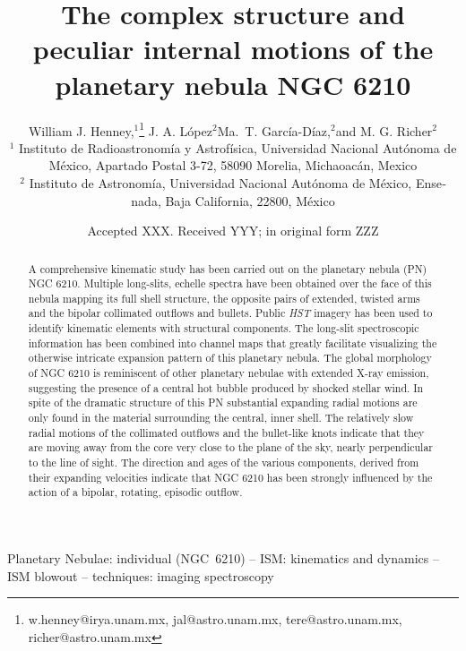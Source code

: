 \documentclass[useAMS, usenatbib]{mnras}
\title{The complex structure and peculiar internal motions of the planetary nebula NGC 6210}
\author[Henney et al.]{
  William J. Henney,\(^1\)\thanks{
    w.henney@irya.unam.mx,
    jal@astro.unam.mx,
    tere@astro.unam.mx,
    richer@astro.unam.mx
  }
  J. A. López\(^2\)\footnotemark[1]
  Ma.\ T. García-Díaz,\(^2\)\footnotemark[1]
  and M. G. Richer\(^2\)\footnotemark[1]
  \\
  \(^1\)\foreignlanguage{spanish}{
    Instituto de Radioastronomía y
    Astrofísica, Universidad Nacional Autónoma de México, Apartado
    Postal 3-72, 58090 Morelia, Michaoacán, Mexico}
  \\
  \(^2\)\foreignlanguage{spanish}{
    Instituto de Astronomía,
    Universidad Nacional Autónoma de México,
    Ensenada, Baja California, 22800, México}
}
\date{Accepted XXX. Received YYY; in original form ZZZ}
\begin{document}
 
\label{firstpage}
\pagerange{\pageref{firstpage}--\pageref{lastpage}}
\maketitle

\begin{abstract}
  A comprehensive kinematic study has been carried out on the planetary nebula (PN) NGC 6210. Multiple long-slits, echelle spectra have been obtained over the face of this nebula mapping its full shell structure, the opposite pairs of extended, twisted arms and the bipolar collimated outflows and bullets. Public {\it HST} imagery has been used to identify kinematic elements with structural components. The long-slit spectroscopic information has been combined into channel maps that greatly facilitate visualizing the otherwise intricate expansion pattern of this  planetary nebula. The global morphology of NGC 6210 is  reminiscent of other planetary nebulae with extended X-ray emission, suggesting the presence of a central hot bubble produced by shocked stellar wind. In spite of the dramatic structure of this PN substantial expanding radial motions are only found in the material surrounding the central, inner shell. The relatively slow radial motions of the collimated outflows and the bullet-like knots indicate that they are  moving away from the core very close to the plane of the sky, nearly perpendicular to the line of sight. The direction and ages of the various components, derived from their expanding velocities indicate that NGC 6210 has been strongly influenced by the  action of a bipolar, rotating, episodic outflow.
\end{abstract}


\begin{keywords}
  Planetary Nebulae: individual (NGC~6210)
  -- ISM: kinematics and dynamics -- ISM blowout
  -- techniques: imaging spectroscopy
\end{keywords}

\maketitle
\end{document}
